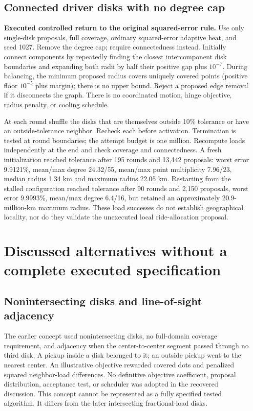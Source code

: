 \documentclass[11pt]{article}
\begin{document}
\subsection{Connected driver disks with no degree cap}
\textbf{Executed controlled return to the original squared-error rule.}
Use only single-disk proposals, full coverage, ordinary squared-error adaptive
heat, and seed 1027. Remove the degree cap; require connectedness instead.
Initially connect components by repeatedly finding the closest intercomponent
disk boundaries and expanding both radii by half their positive gap plus
$10^{-7}$. During balancing, the minimum proposed radius covers uniquely
covered points (positive floor $10^{-5}$ plus margin); there is no upper bound.
Reject a proposed edge removal if it disconnects the graph. There is no
coordinated motion, hinge objective, radius penalty, or cooling schedule.

At each round shuffle the disks that are themselves outside 10\% tolerance or
have an outside-tolerance neighbor. Recheck each before activation. Termination
is tested at round boundaries; the attempt budget is one million. Recompute
loads independently at the end and check coverage and connectedness.
A fresh initialization reached tolerance after 195 rounds and 13,442 proposals:
worst error 9.9121\%, mean/max degree 24.32/55, mean/max point multiplicity
7.96/23, median radius 1.34 km and maximum radius 22.05 km.
Restarting from the stalled configuration reached tolerance after 90 rounds and
2,150 proposals, worst error 9.9993\%, mean/max degree 6.4/16, but retained an
approximately 20.9-million-km maximum radius. These load successes do not
establish geographical locality, nor do they validate the unexecuted local
ride-allocation proposal.

\section{Discussed alternatives without a complete executed specification}
\subsection{Nonintersecting disks and line-of-sight adjacency}
The earlier concept used nonintersecting disks, no full-domain coverage
requirement, and adjacency when the center-to-center segment passed through no
third disk. A pickup inside a disk belonged to it; an outside pickup went to
the nearest center. An illustrative objective rewarded covered dots and
penalized squared neighbor-load differences. No definitive objective coefficient,
proposal distribution, acceptance test, or scheduler was adopted in the recovered
discussion. This concept cannot be represented as a fully specified tested
algorithm. It differs from the later intersecting fractional-load disks.
\end{document}
